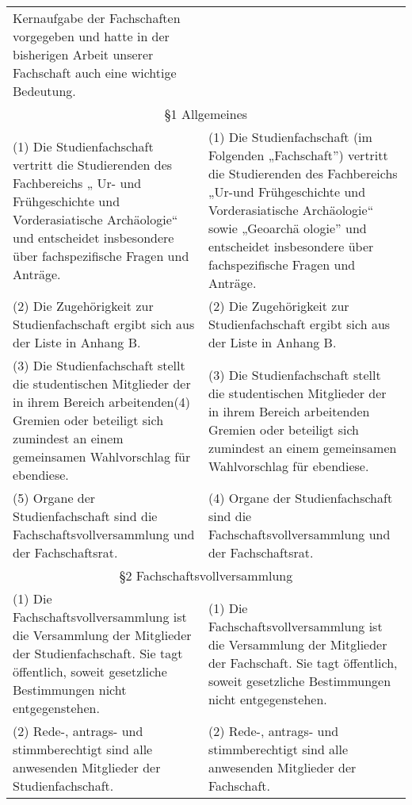 {\begin{longtable}{|p{7.5cm}|p{7.5cm}|}
        Kernaufgabe der Fachschaften vorgegeben und hatte in der bisherigen Arbeit unserer
        Fachschaft auch eine wichtige Bedeutung.
        \\
        \multicolumn{2}{|c|}{§1 Allgemeines}\\\hline
        (1)  Die Studienfachschaft vertritt die Studierenden des Fachbereichs „ Ur-
        und  Frühgeschichte und Vorderasiatische Archäologie“ und entscheidet insbesondere
        über fachspezifische Fragen und Anträge.&
        (1)  Die Studienfachschaft (im Folgenden „Fachschaft”) vertritt die Studierenden des
        Fachbereichs „Ur-und Frühgeschichte und Vorderasiatische Archäologie“ sowie „Geoarchä
        ologie” und entscheidet insbesondere über fachspezifische Fragen und Anträge.\\
        (2)  Die Zugehörigkeit zur Studienfachschaft ergibt sich aus der Liste in
        Anhang B.&
        (2)  Die Zugehörigkeit zur Studienfachschaft ergibt sich aus der Liste in Anhang B.\\
        (3)  Die Studienfachschaft stellt die studentischen Mitglieder der in ihrem
        Bereich arbeitenden\newline (4) Gremien oder beteiligt sich zumindest an einem gemeinsamen
        Wahlvorschlag für ebendiese. &
        (3)  Die Studienfachschaft stellt die studentischen Mitglieder der in ihrem Bereich
        arbeitenden Gremien oder beteiligt sich zumindest an einem gemeinsamen Wahlvorschlag
        für ebendiese.\\
        (5) Organe der Studienfachschaft sind die Fachschaftsvollversammlung und der
        Fachschaftsrat. &
        (4)  Organe der Studienfachschaft sind die Fachschaftsvollversammlung und der
        Fachschaftsrat.\\
        \multicolumn{2}{|c|}{§2 Fachschaftsvollversammlung}\\\hline
        (1)  Die Fachschaftsvollversammlung ist die Versammlung der Mitglieder der
        Studienfachschaft. Sie tagt öffentlich, soweit gesetzliche Bestimmungen nicht
        entgegenstehen.&
        (1)  Die Fachschaftsvollversammlung ist die Versammlung der Mitglieder der
        Fachschaft.  Sie tagt öffentlich, soweit gesetzliche Bestimmungen nicht
        entgegenstehen.\\
        (2) Rede-, antrags- und stimmberechtigt sind alle anwesenden Mitglieder der
        Studienfachschaft.&
        (2)  Rede-, antrags- und stimmberechtigt sind alle anwesenden Mitglieder der
        Fachschaft. \\

\end{longtable}}
